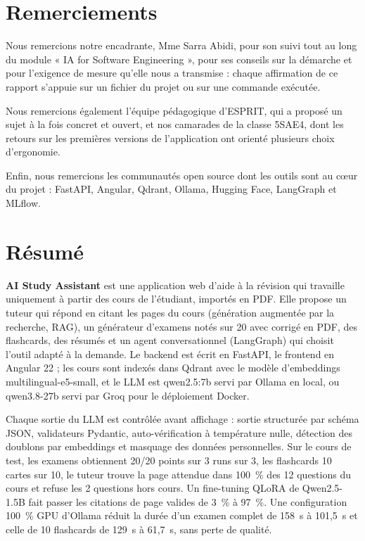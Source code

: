 \documentclass[12pt,a4paper]{report}
\newcommand{\encadrant}{Mme Sarra Abidi}
\begin{document}
\chapter*{Remerciements}

Nous remercions notre encadrante, \encadrant, pour son suivi tout au long du module « IA for Software
Engineering », pour ses conseils sur la démarche et pour l'exigence de mesure qu'elle nous a transmise :
chaque affirmation de ce rapport s'appuie sur un fichier du projet ou sur une commande exécutée.

Nous remercions également l'équipe pédagogique d'ESPRIT, qui a proposé un sujet à la fois concret et
ouvert, et nos camarades de la classe 5SAE4, dont les retours sur les premières versions de
l'application ont orienté plusieurs choix d'ergonomie.

Enfin, nous remercions les communautés open source dont les outils sont au cœur du projet : FastAPI,
Angular, Qdrant, Ollama, Hugging Face, LangGraph et MLflow.

\chapter*{Résumé}

\textbf{AI Study Assistant} est une application web d'aide à la révision qui travaille uniquement à
partir des cours de l'étudiant, importés en PDF. Elle propose un tuteur qui répond en citant les pages
du cours (génération augmentée par la recherche, RAG), un générateur d'examens notés sur 20 avec
corrigé en PDF, des flashcards, des résumés et un agent conversationnel (LangGraph) qui choisit l'outil
adapté à la demande. Le backend est écrit en FastAPI, le frontend en Angular 22 ; les cours sont indexés
dans Qdrant avec le modèle d'embeddings multilingual-e5-small, et le LLM est qwen2.5:7b servi par Ollama
en local, ou qwen3.8-27b servi par Groq pour le déploiement Docker.

Chaque sortie du LLM est contrôlée avant affichage : sortie structurée par schéma JSON, validateurs
Pydantic, auto-vérification à température nulle, détection des doublons par embeddings et masquage des
données personnelles. Sur le cours de test, les examens obtiennent 20/20 points sur 3 runs sur 3, les
flashcards 10 cartes sur 10, le tuteur trouve la page attendue dans 100~\% des 12 questions du cours et
refuse les 2 questions hors cours. Un fine-tuning QLoRA de Qwen2.5-1.5B fait passer les citations de page
valides de 3~\% à 97~\%. Une configuration 100~\% GPU d'Ollama réduit la durée d'un examen complet de
158~s à 101,5~s et celle de 10 flashcards de 129~s à 61,7~s, sans perte de qualité.
\end{document}
